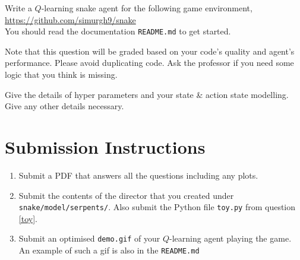 \documentclass{homework}
\begin{document}
\question Write a $Q$-learning snake agent for the following game environment,\\
\url{https://github.com/simurgh9/snake}\\
You should read the documentation \texttt{README.md} to get started.

Note that this question will be graded based on your code's quality
and agent's performance. Please avoid duplicating code. Ask the
professor if you need some logic that you think is missing.

Give the details of hyper parameters and your state \& action state
modelling. Give any other details necessary.

\section*{Submission Instructions}
\begin{enumerate}
  \item Submit a PDF that answers all the questions including any plots.
  \item Submit the contents of the director that you created under
  \texttt{snake/model/serpents/}. Also submit the Python file
  \texttt{toy.py} from question \ref{toy}.
  \item Submit an optimised \texttt{demo.gif} of your $Q$-learning
  agent playing the game. An example of such a gif is also in the
  \texttt{README.md}
\end{enumerate}
\end{document}
